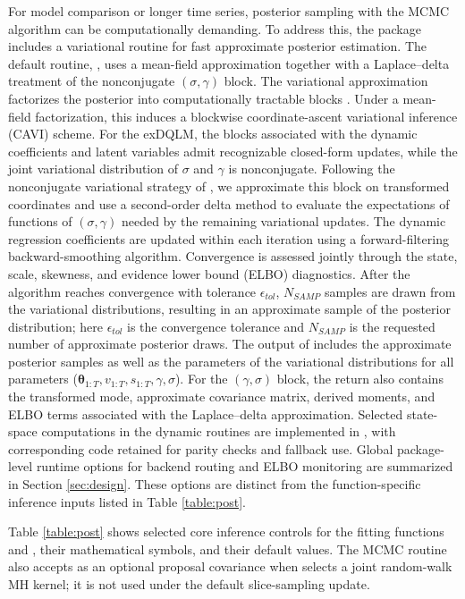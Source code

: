 \documentclass{jss}
\newcommand{\vect}[1]{\boldsymbol{#1}}
\begin{document}
For model comparison or longer time series, posterior sampling with the MCMC algorithm can be computationally demanding. To address this, the package includes a variational routine for fast approximate posterior estimation. The default routine, , uses a mean-field approximation together with a Laplace--delta treatment of the nonconjugate $(\sigma,\gamma)$ block. The variational approximation factorizes the posterior into computationally tractable blocks \citep{ostwald2014tutorial,beal2003variational}. Under a mean-field factorization, this induces a blockwise coordinate-ascent variational inference (CAVI) scheme. For the exDQLM, the blocks associated with the dynamic coefficients and latent variables admit recognizable closed-form updates, while the joint variational distribution of $\sigma$ and $\gamma$ is nonconjugate. Following the nonconjugate variational strategy of \cite{wang2013nonconjugatevb}, we approximate this block on transformed coordinates and use a second-order delta method to evaluate the expectations of functions of $(\sigma,\gamma)$ needed by the remaining variational updates. The dynamic regression coefficients are updated within each iteration using a forward-filtering backward-smoothing algorithm. Convergence is assessed jointly through the state, scale, skewness, and evidence lower bound (ELBO) diagnostics. After the algorithm reaches convergence with tolerance $\epsilon_{tol}$, $N_{SAMP}$ samples are drawn from the variational distributions, resulting in an approximate sample of the posterior distribution; here $\epsilon_{tol}$ is the convergence tolerance and $N_{SAMP}$ is the requested number of approximate posterior draws. The output of  includes the approximate posterior samples as well as the parameters of the variational distributions for all parameters ($\vect{\theta}_{1:T},v_{1:T},s_{1:T},\gamma,\sigma$). For the $(\gamma,\sigma)$ block, the return also contains the transformed mode, approximate covariance matrix, derived moments, and ELBO terms associated with the Laplace--delta approximation. Selected state-space computations in the dynamic routines are implemented in , with corresponding  code retained for parity checks and fallback use. Global package-level runtime options for backend routing and ELBO monitoring are summarized in Section \ref{sec:design}. These options are distinct from the function-specific inference inputs listed in Table \ref{table:post}.

Table \ref{table:post} shows selected core inference controls for the fitting functions  and , their mathematical symbols, and their default values. The MCMC routine also accepts  as an optional proposal covariance when  selects a joint random-walk MH kernel; it is not used under the default slice-sampling update.
\end{document}

